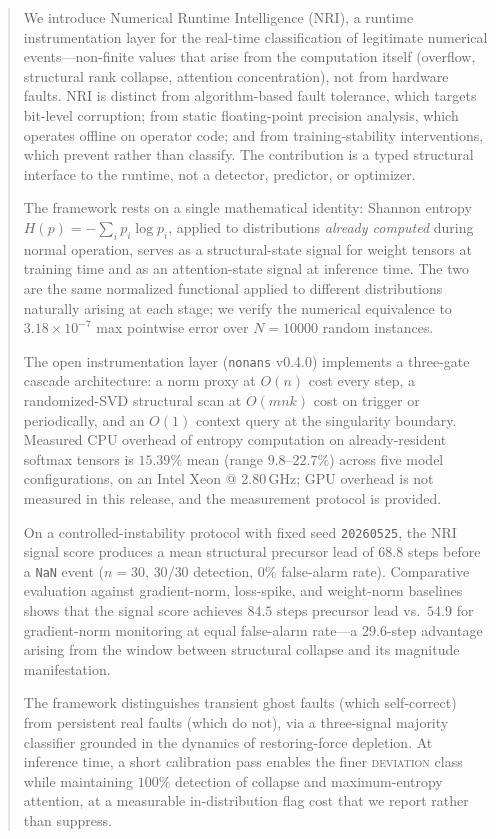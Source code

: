\documentclass[11pt,a4paper]{article}
\theoremstyle{plain}
\begin{document}
\begin{abstract}
We introduce Numerical Runtime Intelligence (NRI), a runtime
instrumentation layer for the real-time classification of legitimate
numerical events---non-finite values that arise from the computation
itself (overflow, structural rank collapse, attention concentration),
not from hardware faults.
NRI is distinct from algorithm-based fault tolerance, which targets
bit-level corruption; from static floating-point precision analysis,
which operates offline on operator code; and from training-stability
interventions, which prevent rather than classify.
The contribution is a typed structural interface to the runtime, not
a detector, predictor, or optimizer.

The framework rests on a single mathematical identity: Shannon entropy
$H(p) = -\sum_i p_i \log p_i$, applied to distributions \emph{already
computed} during normal operation, serves as a structural-state
signal for weight tensors at training time and as an attention-state
signal at inference time. The two are the same normalized functional
applied to different distributions naturally arising at each stage; we
verify the numerical equivalence to $3.18 \times 10^{-7}$ max pointwise
error over $N = \num{10000}$ random instances.

The open instrumentation layer (\texttt{nonans} v0.4.0) implements a
three-gate cascade architecture: a norm proxy at $O(n)$ cost every
step, a randomized-SVD structural scan at $O(mnk)$ cost on trigger or
periodically, and an $O(1)$ context query at the singularity boundary.
Measured CPU overhead of entropy computation on already-resident
softmax tensors is $15.39\%$ mean (range $9.8$--$22.7\%$) across five
model configurations, on an Intel Xeon @ 2.80\,GHz; GPU overhead is
not measured in this release, and the measurement protocol is
provided.

On a controlled-instability protocol with fixed seed \texttt{20260525},
the NRI signal score produces a mean structural precursor lead of
$68.8$ steps before a \texttt{NaN} event ($n = 30$, $30/30$ detection,
$0\%$ false-alarm rate). Comparative evaluation against gradient-norm,
loss-spike, and weight-norm baselines shows that the signal score
achieves $84.5$ steps precursor lead vs.\ $54.9$ for gradient-norm
monitoring at equal false-alarm rate---a $29.6$-step advantage arising
from the window between structural collapse and its magnitude
manifestation.

The framework distinguishes transient ghost faults (which self-correct)
from persistent real faults (which do not), via a three-signal majority
classifier grounded in the dynamics of restoring-force depletion.
At inference time, a short calibration pass enables the finer
\textsc{deviation} class while maintaining $100\%$ detection of collapse
and maximum-entropy attention, at a measurable in-distribution
flag cost that we report rather than suppress.


\end{abstract}
\end{document}
